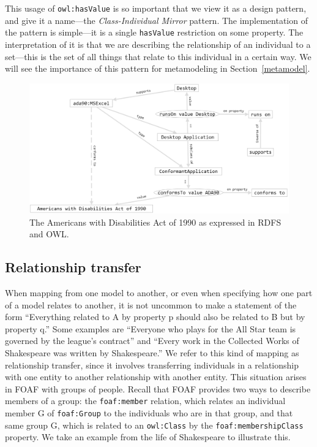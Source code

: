 This usage of \texttt{owl:hasValue} is so important that we view it as a design
pattern, and give it a name---the \emph{Class-Individual Mirror} pattern. The
implementation of the pattern is simple---it is a single \texttt{hasValue}
restriction on some property. The interpretation of it is that we are
describing the relationship of an individual to a set---this is the set
of all things that relate to this individual in a certain way. We will
see the importance of this pattern for metamodeling in Section~\ref{metamodel}.

\begin{figure}
\centering
\includegraphics[width=5in]{SWWOv3/media/ch12/figure12-10.png}
\caption{The Americans with Disabilities Act of 1990 as expressed in RDFS and OWL.}
\label{fig:ch12.10}
\end{figure}



\subsection{Relationship transfer}
\label{ch12:Transfer} 

When mapping from one model to another, or even when specifying how one
part of a model relates to another, it is not uncommon to make a
statement of the form ``Everything related to A by property p should
also be related to B but by property q.'' Some examples are ``Everyone
who plays for the All Star team is governed by the league's contract''
and ``Every work in the Collected Works of Shakespeare was written by
Shakespeare.'' We refer to this kind of mapping as relationship
transfer, since it involves transferring individuals in a relationship
with one entity to another relationship with another entity. This
situation arises in FOAF with groups of people. Recall that FOAF
provides two ways to describe members of a group: the \texttt{foaf:member}
relation, which relates an individual member G of \texttt{foaf:Group} to the
individuals who are in that group, and that same group G, which is
related to an \texttt{owl:Class} by the \texttt{foaf:membershipClass} property. We take an
example from the life of Shakespeare to illustrate this.



